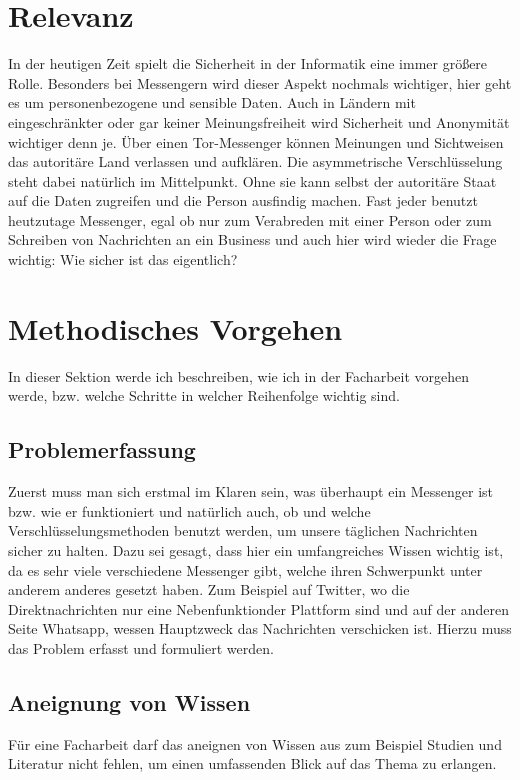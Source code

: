 \documentclass[a4paper,10pt,ngerman,
  headheight=28pt,]{scrartcl}
\begin{document}
\section{Relevanz}
In der heutigen Zeit spielt die Sicherheit in der Informatik eine immer größere Rolle. Besonders bei Messengern wird dieser Aspekt nochmals wichtiger, hier geht es um personenbezogene und sensible Daten. Auch in Ländern mit eingeschränkter oder gar keiner Meinungsfreiheit wird Sicherheit und Anonymität wichtiger denn je. Über einen Tor-Messenger können Meinungen und Sichtweisen das autoritäre Land verlassen und aufklären. Die asymmetrische Verschlüsselung steht dabei natürlich im Mittelpunkt. Ohne sie kann selbst der autoritäre Staat auf die Daten zugreifen und die Person ausfindig machen. Fast jeder benutzt heutzutage Messenger, egal ob nur zum Verabreden mit einer Person oder zum Schreiben von Nachrichten an ein Business und auch hier wird wieder die Frage wichtig: Wie sicher ist das eigentlich?

\section{Methodisches Vorgehen}
In dieser Sektion werde ich beschreiben, wie ich in der Facharbeit vorgehen werde, bzw. welche Schritte in welcher Reihenfolge wichtig sind.

\subsection{Problemerfassung}
Zuerst muss man sich erstmal im Klaren sein, was überhaupt ein Messenger ist bzw. wie er funktioniert und natürlich auch, ob und welche Verschlüsselungsmethoden benutzt werden, um unsere täglichen Nachrichten sicher zu halten. Dazu sei gesagt, dass hier ein umfangreiches Wissen wichtig ist, da es sehr viele verschiedene Messenger gibt, welche ihren Schwerpunkt unter anderem anderes gesetzt haben. Zum Beispiel auf Twitter, wo die Direktnachrichten nur eine \glqq Nebenfunktion\grqq der Plattform sind und auf der anderen Seite Whatsapp, wessen Hauptzweck das Nachrichten verschicken ist. Hierzu muss das Problem erfasst und formuliert werden.

\subsection{Aneignung von Wissen}
Für eine Facharbeit darf das aneignen von Wissen aus zum Beispiel Studien und Literatur nicht fehlen, um einen umfassenden Blick auf das Thema zu erlangen.
\end{document}

